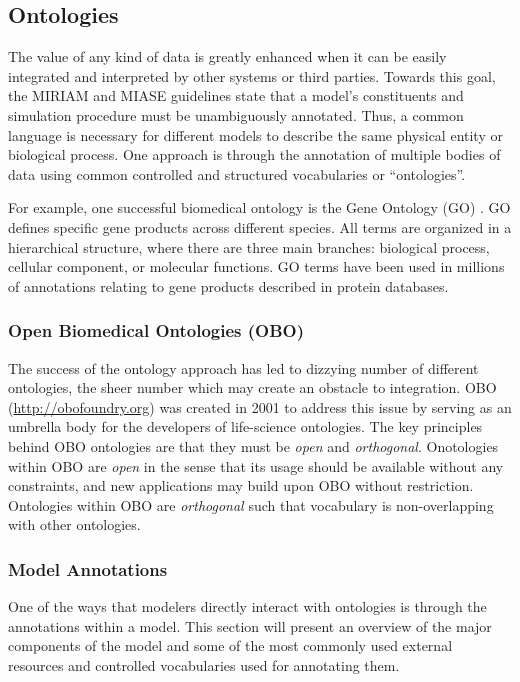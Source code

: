 \documentclass[]{article}
\begin{document}
\subsection{Ontologies}

The value of any kind of data is greatly enhanced when it can be easily
integrated and interpreted by other systems or third parties. Towards
this goal, the MIRIAM and MIASE guidelines state that a model's
constituents and simulation procedure must be unambiguously annotated.
Thus, a common language is necessary for different models to describe
the same physical entity or biological process. One approach is through
the annotation of multiple bodies of data using common controlled and
structured vocabularies or ``ontologies''.

For example, one successful biomedical ontology is the Gene Ontology
(GO) \autocite{smith2005relations}. GO defines specific gene products
across different species. All terms are organized in a hierarchical
structure, where there are three main branches: biological process,
cellular component, or molecular functions. GO terms have been used in
millions of annotations relating to gene products described in protein
databases.

\subsubsection{Open Biomedical Ontologies (OBO)}

The success of the ontology approach has led to dizzying number of
different ontologies, the sheer number which may create an obstacle to
integration. OBO (\url{http://obofoundry.org}) \autocite{smith2007obo}
was created in 2001 to address this issue by serving as an umbrella body
for the developers of life-science ontologies. The key principles behind
OBO \autocite{smith2007obo} ontologies are that they must be \emph{open}
and \emph{orthogonal}. Onotologies within OBO are \emph{open} in the
sense that its usage should be available without any constraints, and
new applications may build upon OBO without restriction. Ontologies
within OBO are \emph{orthogonal} such that vocabulary is non-overlapping
with other ontologies.

\subsubsection{Model Annotations}

One of the ways that modelers directly interact with ontologies is
through the annotations within a model. This section will present an
overview of the major components of the model and some of the most
commonly used external resources and controlled vocabularies used for
annotating them.
\end{document}
